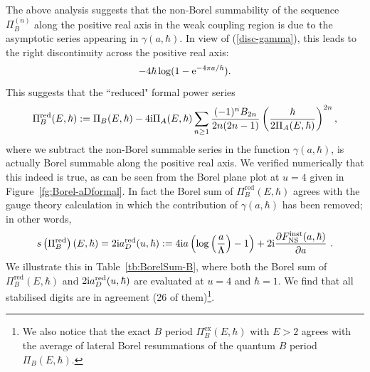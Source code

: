 \documentclass[a4paper,11pt]{article}
\theoremstyle{definition}
\newcommand{\re}{{\rm e}}
\newcommand{\ri}{{\rm i}}
\def\({\left(}
\def\){\right)}
\newcommand{\pd}{\partial}
\begin{document}
The above analysis suggests that the non-Borel summability of the
sequence $\Pi_B^{(n)}$ along the positive real axis in the weak
coupling region is due to the asymptotic series appearing in
$\gamma(a,\hbar)$. In view of (\ref{disc-gamma}), this leads to the
right discontinuity across the positive real axis:
%
\begin{equation}
  -4 \hbar \log (1 -\re^{-4 \pi a/\hbar}). 
\end{equation}
This suggests that the ``reduced" formal power series
%
\begin{equation}\label{piBformal}
  \Pi^{\text{red}}_B(E,\hbar):=
  \Pi_B(E,\hbar)-4 \ri \Pi_A (E,\hbar)
  \sum_{n \ge 1} {(-1)^n B_{2n} \over 2n (2n-1)}
  \left( {\hbar \over 2\Pi_A(E,\hbar)}\right)^{2n},
\end{equation}
%
where we subtract the non-Borel summable series in the function
$\gamma(a, \hbar)$, is actually Borel summable along the positive real
axis. We verified numerically that this indeed is true, as can be seen
from the Borel plane plot at $u=4$ given in
Figure~\ref{fg:Borel-aDformal}. In fact the Borel sum of
$\Pi^{\text{red}}_B(E,\hbar)$
agrees with the gauge theory calculation in which the contribution of
$\gamma(a,\hbar)$ has been removed; in other words,
%
\begin{equation}\label{ared}
  s\left( \Pi^{\text{red}}_B \right)(E,\hbar)=2\ri a_D^{\text{red}}(u,\hbar):= 4\ri
  a\(\log\(\frac{a}{\Lambda}\)-1\)
  +2\ri\frac{\pd F^{\text{inst}}_{\text{NS}}(a,\hbar)}{\pd a} \ .
\end{equation}
We illustrate this in Table~\ref{tb:BorelSum-B}, where both the Borel
sum of $\Pi^{\text{red}}_B(E,\hbar)$ and
$2\ri a_D^{\text{red}}(u,\hbar)$ are evaluated at $u=4$ and
$\hbar=1$. We find that all stabilised digits are in agreement (26 of
them)\footnote{We also notice that the exact $B$ period
  $\Pi_B^{\text{ex}}(E,\hbar)$ with $E>2$ agrees with the average of
  lateral Borel resummations of the quantum $B$ period
  $\Pi_B(E,\hbar)$.}.
\end{document}
